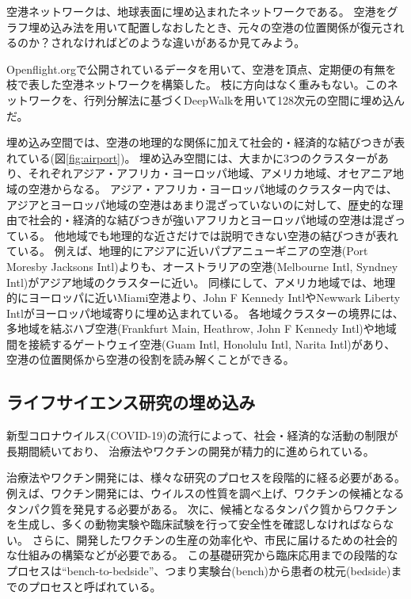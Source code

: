 \documentclass[J]{scitrans}
\begin{document}
空港ネットワークは、地球表面に埋め込まれたネットワークである。
空港をグラフ埋め込み法を用いて配置しなおしたとき、元々の空港の位置関係が復元されるのか？されなければどのような違いがあるか見てみよう。

Openflight.orgで公開されているデータ\cite{opsahl_2011}を用いて、空港を頂点、定期便の有無を枝で表した空港ネットワークを構築した。
枝に方向はなく重みもない。このネットワークを、行列分解法\cite{Qiu2018}に基づくDeepWalkを用いて128次元の空間に埋め込んだ。


埋め込み空間では、空港の地理的な関係に加えて社会的・経済的な結びつきが表れている(図\ref{fig:airport})。
埋め込み空間には、大まかに3つのクラスターがあり、それぞれアジア・アフリカ・ヨーロッパ地域、アメリカ地域、オセアニア地域の空港からなる。
アジア・アフリカ・ヨーロッパ地域のクラスター内では、アジアとヨーロッパ地域の空港はあまり混ざっていないのに対して、歴史的な理由で社会的・経済的な結びつきが強いアフリカとヨーロッパ地域の空港は混ざっている。
他地域でも地理的な近さだけでは説明できない空港の結びつきが表れている。
例えば、地理的にアジアに近いパプアニューギニアの空港(Port Moresby Jacksons Intl)よりも、オーストラリアの空港(Melbourne Intl, Syndney Intl)がアジア地域のクラスターに近い。
同様にして、アメリカ地域では、地理的にヨーロッパに近いMiami空港より、John F Kennedy IntlやNewwark Liberty Intlがヨーロッパ地域寄りに埋め込まれている。
各地域クラスターの境界には、多地域を結ぶハブ空港(Frankfurt Main, Heathrow, John F Kennedy Intl)や地域間を接続するゲートウェイ空港(Guam Intl, Honolulu Intl, Narita Intl)があり、
空港の位置関係から空港の役割を読み解くことができる。

\subsection{ライフサイエンス研究の埋め込み}

新型コロナウイルス(COVID-19)の流行によって、社会・経済的な活動の制限が長期間続いており、
治療法やワクチンの開発が精力的に進められている。

治療法やワクチン開発には、様々な研究のプロセスを段階的に経る必要がある。
例えば、ワクチン開発には、ウイルスの性質を調べ上げ、ワクチンの候補となるタンパク質を発見する必要がある。
次に、候補となるタンパク質からワクチンを生成し、多くの動物実験や臨床試験を行って安全性を確認しなければならない。
さらに、開発したワクチンの生産の効率化や、市民に届けるための社会的な仕組みの構築などが必要である。
この基礎研究から臨床応用までの段階的なプロセスは``bench-to-bedside''、つまり実験台(bench)から患者の枕元(bedside)までのプロセスと呼ばれている。
\end{document}
